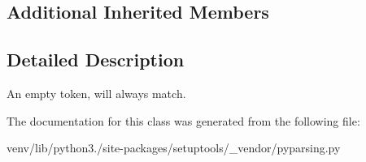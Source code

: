 \subsection*{Additional Inherited Members}


\subsection{Detailed Description}
\begin{DoxyVerb}An empty token, will always match.
\end{DoxyVerb}
 

The documentation for this class was generated from the following file\+:\begin{DoxyCompactItemize}
\item 
venv/lib/python3./site-\/packages/setuptools/\+\_\+vendor/pyparsing.\+py\end{DoxyCompactItemize}
